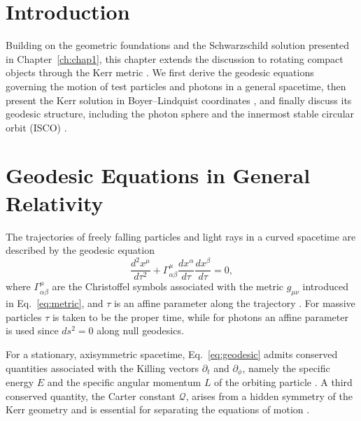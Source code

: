 \label{ch:chap2}

\section{Introduction}
Building on the geometric foundations and the Schwarzschild solution presented in Chapter~\ref{ch:chap1}, this chapter extends the discussion to rotating compact objects through the Kerr metric \cite{kerr1963}. We first derive the geodesic equations governing the motion of test particles and photons in a general spacetime, then present the Kerr solution in Boyer--Lindquist coordinates \cite{boyerlindquist1967}, and finally discuss its geodesic structure, including the photon sphere and the innermost stable circular orbit (ISCO) \cite{bardeen1972}.

\section{Geodesic Equations in General Relativity}

The trajectories of freely falling particles and light rays in a curved spacetime are described by the geodesic equation
\begin{equation}
	\frac{d^2 x^{\mu}}{d\tau^2} + \Gamma^{\mu}_{\alpha\beta}\frac{dx^{\alpha}}{d\tau}\frac{dx^{\beta}}{d\tau} = 0,
	\label{eq:geodesic}
\end{equation}
where $\Gamma^{\mu}_{\alpha\beta}$ are the Christoffel symbols  associated with the metric $g_{\mu\nu}$ introduced in Eq.~\eqref{eq:metric}, and $\tau$ is an affine parameter along the trajectory \cite{misner1973}. For massive particles $\tau$ is taken to be the proper time, while for photons an affine parameter is used since $ds^2=0$ along null geodesics.

For a stationary, axisymmetric spacetime, Eq.~\eqref{eq:geodesic} admits conserved quantities associated with the Killing vectors $\partial_t$ and $\partial_\phi$, namely the specific energy $E$ and the specific angular momentum $L$ of the orbiting particle \cite{wald1984}. A third conserved quantity, the Carter constant $\mathcal{Q}$, arises from a hidden symmetry of the Kerr geometry and is essential for separating the equations of motion \cite{carter1968}.


